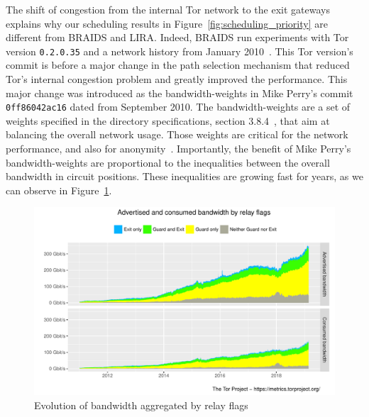 The shift of congestion from the internal Tor network to the exit gateways
explains why our scheduling results in Figure~\ref{fig:scheduling_priority} are
different from BRAIDS and LIRA. Indeed, BRAIDS run experiments with Tor version
\texttt{0.2.0.35} and a network history from January
2010~\cite{braids-repository}. This Tor version's commit is before a major
change in the path selection mechanism that reduced Tor's internal congestion
problem and greatly improved the performance. This major change was introduced
as the bandwidth-weights in Mike Perry's commit \texttt{0ff86042ac16} dated from
September 2010. The bandwidth-weights are a set of weights specified in the
directory specifications, section 3.8.4~\cite{dirspec}, that aim at balancing
the overall network usage. Those weights are critical for the network
performance, and also for anonymity~\cite{waterfilling-pets2017, wf_proposal}.
Importantly, the benefit of Mike Perry's bandwidth-weights are proportional to
the inequalities between the overall bandwidth in circuit positions. These
inequalities are growing fast for years, as we can observe in
Figure~\ref{fig:bw_inequalities}.

\begin{figure}
  \includegraphics[scale=0.415]{images/bandwidth-flags-2011-01-01-2019-02-25.pdf}
  \caption{Evolution of bandwidth aggregated by relay
    flags} \label{fig:bw_inequalities}
\end{figure}


